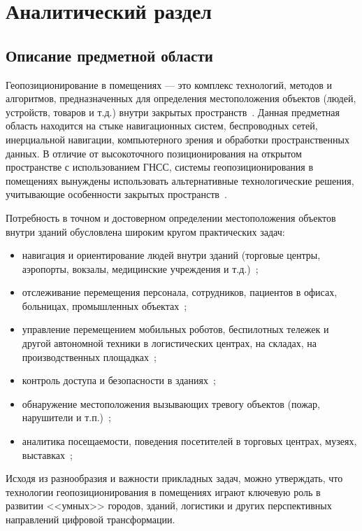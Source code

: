 \chapter{Аналитический раздел}

\section{Описание предметной области}

Геопозиционирование в помещениях --- это комплекс технологий, методов и алгоритмов, предназначенных для определения местоположения объектов (людей, устройств, товаров и т.д.) внутри закрытых пространств~\cite{basebook}. Данная предметная область находится на стыке навигационных систем, беспроводных сетей, инерциальной навигации, компьютерного зрения и обработки пространственных данных. В отличие от высокоточного позиционирования на открытом пространстве с использованием ГНСС, системы геопозиционирования в помещениях вынуждены использовать альтернативные технологические решения, учитывающие особенности закрытых пространств~\cite{vislight}.

Потребность в точном и достоверном определении местоположения объектов внутри зданий обусловлена широким кругом практических задач:

\begin{itemize}[label=---]
    \item навигация и ориентирование людей внутри зданий (торговые центры, аэропорты, вокзалы, медицинские учреждения и т.д.)~\cite{intro};
    \item отслеживание перемещения персонала, сотрудников, пациентов в офисах, больницах, промышленных объектах~\cite{staffpos};
    \item управление перемещением мобильных роботов, беспилотных тележек и другой автономной техники в логистических центрах, на складах, на производственных площадках~\cite{basebook};
    \item контроль доступа и безопасности в зданиях~\cite{accesscontrol};
    \item обнаружение местоположения вызывающих тревогу объектов (пожар, нарушители и т.п.)~\cite{trespassers};
    \item аналитика посещаемости, поведения посетителей в торговых центрах, музеях, выставках~\cite{occupancy};
\end{itemize}

Исходя из разнообразия и важности прикладных задач, можно утверждать, что технологии геопозиционирования в помещениях играют ключевую роль в развитии <<умных>> городов, зданий, логистики и других перспективных направлений цифровой трансформации.

